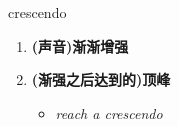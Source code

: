 
\begin{frame}
{\huge crescendo}
\begin{center}
\begin{enumerate}\Large
  \item \textbf{(声音)渐渐增强}
  \item \textbf{(渐强之后达到的)顶峰}
  \begin{itemize}
    \item \em{\Large{reach a crescendo}}
  \end{itemize}
\end{enumerate}
\end{center}
\end{frame}
